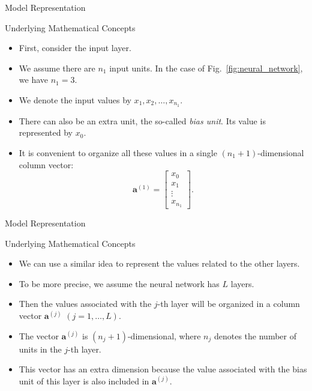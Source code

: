 \documentclass[8pt,american]{beamer}
\begin{document}
\begin{frame}{Model Representation}

\begin{block}{Underlying Mathematical Concepts}
\begin{itemize}
\justifying
\item First, consider the input layer.
\item We assume there are $n_{1}$ input units. In the case of
  Fig.~\ref{fig:neural_network}, we have $n_{1}=3$.
\item We denote the input values by $x_{1},x_{2},\ldots,x_{n_{1}}$.
\item There can also be an extra unit, the so-called \textit{bias unit}. Its
  value is represented by $x_{0}$.
\item It is convenient to organize all these values in a single
  $\left(n_{1}+1\right)$-dimensional column vector:
  \begin{equation}
  \mathbf{a}^{\left(1\right)}=\begin{bmatrix}x_{0}\\
  x_{1}\\
  \vdots\\
  x_{n_{1}}
  \end{bmatrix}.
  \end{equation}
\end{itemize}
\end{block}

\end{frame}

\begin{frame}{Model Representation}

\begin{block}{Underlying Mathematical Concepts}
\begin{itemize}
\justifying
\item We can use a similar idea to represent the values related to the other
  layers.
\item To be more precise, we assume the neural network has $L$ layers.
\item Then the values associated with the $j$-th layer will be organized in a
  column vector $\mathbf{a}^{\left(j\right)}$ $\left(j=1,\ldots,L\right)$.
\item The vector $\mathbf{a}^{\left(j\right)}$ is
  $\left(n_{j}+1\right)$-dimensional, where $n_{j}$ denotes the number of units
  in the $j$-th layer.
\item This vector has an extra dimension because the value associated with the
  bias unit of this layer is also included in $\mathbf{a}^{\left(j\right)}$.
\end{itemize}
\end{block}

\end{frame}
\end{document}

